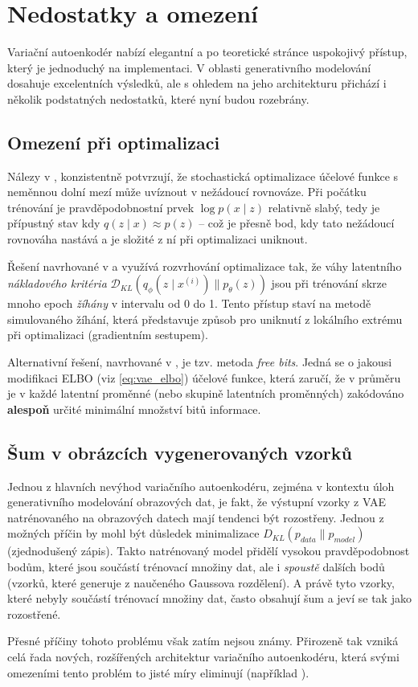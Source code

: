  \section{Nedostatky a omezení}
Variační autoenkodér nabízí elegantní a po teoretické stránce uspokojivý přístup, který je jednoduchý na implementaci.
V oblasti generativního modelování dosahuje excelentních výsledků, ale s ohledem na jeho architekturu přichází i několik podstatných nedostatků, které nyní budou rozebrány.
\subsection{Omezení při optimalizaci}
Nálezy v \cite{Bowman2016}, \cite{Soenderby2016} konzistentně potvrzují, že stochastická optimalizace účelové funkce s neměnnou dolní mezí může uvíznout v nežádoucí rovnováze.
Při počátku trénování je pravděpodobnostní prvek $\log p(x\mid z)$ relativně slabý, tedy je přípustný stav kdy $q(z \mid x) \approx p(z)$ – což je přesně bod, kdy tato nežádoucí rovnováha nastává a je složité z ní při optimalizaci uniknout.

Řešení navrhované v \cite{Bowman2016} a \cite{Soenderby2016} využívá rozvrhování optimalizace tak, že váhy latentního \emph{nákladového kritéria} $\mathcal{D}_{KL}(q_\phi(z\mid x^{(i)})\parallel p_\theta(z))$ jsou při trénování skrze mnoho epoch \emph{žíhány} v intervalu od 0 do 1.
Tento přístup staví na metodě simulovaného žíhání, která představuje způsob pro uniknutí z lokálního extrému při optimalizaci (gradientním sestupem). \cite{Kirkpatrick1983}

Alternativní řešení, navrhované v \cite{Kingma2016}, je tzv. metoda \emph{free bits}. Jedná se o jakousi modifikaci ELBO (viz \autoref{eq:vae_elbo}) účelové funkce,
která zaručí, že v průměru je v každé latentní proměnné (nebo skupině latentních proměnných) zakódováno \textbf{alespoň} určité minimální množství bitů informace.


\subsection{Šum v obrázcích vygenerovaných vzorků}
\label{sec:vae_bluriness}
Jednou z hlavních nevýhod variačního autoenkodéru, zejména v kontextu úloh generativního modelování obrazových dat, je fakt, že výstupní vzorky z VAE natrénovaného na obrazových datech mají tendenci být rozostřeny.
Jednou z možných příčin by mohl být důsledek minimalizace $D_{KL}(p_{data}\parallel p_{model})$ (zjednodušený zápis).
Takto natrénovaný model přidělí vysokou pravděpodobnost bodům, které jsou součástí trénovací množiny dat, ale i \emph{spoustě} dalších bodů (vzorků, které generuje z naučeného Gaussova rozdělení). A právě tyto vzorky, které nebyly součástí trénovací množiny dat, často obsahují šum a jeví se tak jako rozostřené. \cite{Goodfellow2016}

Přesné příčiny tohoto problému však zatím nejsou známy. Přirozeně tak vzniká celá řada nových, rozšířených architektur variačního autoenkodéru, která svými omezeními tento problém to jisté míry eliminují (například \cite{Sohn2015}).